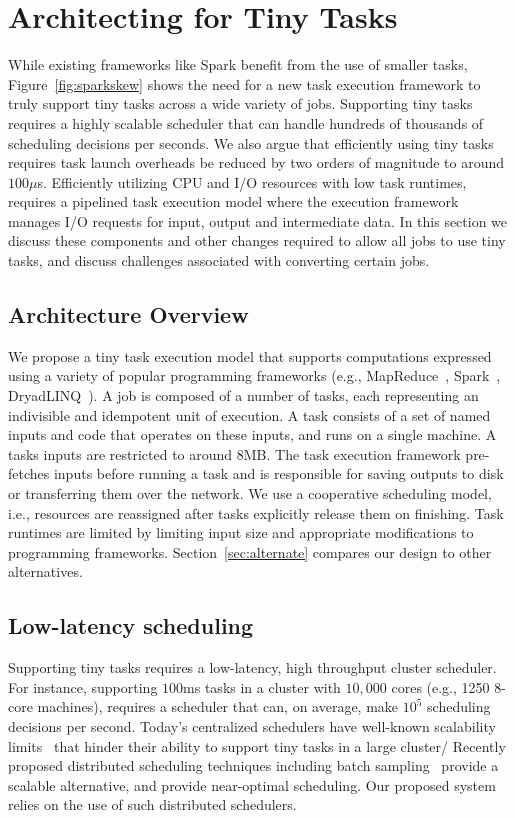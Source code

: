 \section{Architecting for Tiny Tasks}
\label{sec:architecture}
While existing frameworks like Spark benefit from the use of smaller tasks, Figure~\ref{fig:sparkskew}
shows the need for a new task execution framework to truly support tiny tasks across a wide
variety of jobs.
Supporting tiny tasks requires a highly scalable scheduler that can handle hundreds 
of thousands of scheduling decisions per seconds. We also argue that efficiently using
tiny tasks requires task launch overheads be reduced by two orders of magnitude to around $100\mu$s.
Efficiently utilizing CPU and I/O resources with low task runtimes, requires
a pipelined task execution model where the execution framework manages I/O
requests for input, output and intermediate data. In this section
we discuss these components and other changes required to allow all jobs to use
tiny tasks, and discuss challenges associated with converting certain jobs.

\subsection{Architecture Overview}
We propose a tiny task execution model that supports computations expressed using 
a variety of popular programming frameworks (e.g., MapReduce~\cite{dean2008mapreduce},
Spark~\cite{zaharia2010spark}, DryadLINQ~\cite{yu2008dryadlinq}). 
A job is composed of a number of tasks, each representing an indivisible
and idempotent unit of execution. A task consists of a set of named inputs
and code that operates on these inputs, and runs on a single machine.
A tasks inputs are restricted to around 8MB. The task execution framework
pre-fetches inputs before running a task and is responsible for saving
outputs to disk or transferring them over the network.  We use a cooperative 
scheduling model, i.e., resources are reassigned after tasks explicitly release 
them on finishing. Task runtimes are limited by limiting input size and
appropriate modifications to programming frameworks. Section~\ref{sec:alternate} 
compares our design to other alternatives.

\subsection{Low-latency scheduling}
Supporting tiny tasks requires a low-latency, high throughput cluster scheduler.
For instance, supporting $100$ms tasks in a cluster with $10,000$ cores
(e.g., 1250 8-core machines),
requires a scheduler that can, on average, make $10^5$ scheduling
decisions per second.
Today's centralized schedulers have well-known scalability
limits~\cite{wilkesberkeley} that
hinder their ability to support tiny tasks in a large cluster/
Recently proposed distributed scheduling techniques including batch
sampling~\cite{ousterhoutbatch} provide a scalable alternative, and provide
near-optimal scheduling.
Our proposed system relies on the use of such distributed schedulers.


